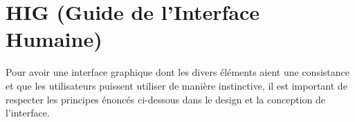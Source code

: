 \section{HIG (Guide de l'Interface Humaine)}
Pour avoir une interface graphique dont les divers éléments aient une consistance et que les utilisateurs puissent utiliser de manière instinctive, il est important de respecter les principes énoncés ci-dessous dans le design et la conception de l'interface.


